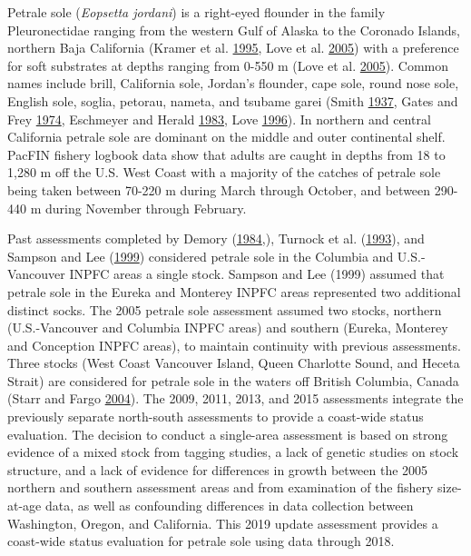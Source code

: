 \documentclass[12pt,]{article}
\begin{document}
Petrale sole (\emph{Eopsetta jordani}) is a right-eyed flounder in the
family Pleuronectidae ranging from the western Gulf of Alaska to the
Coronado Islands, northern Baja California (Kramer et al.
\protect\hyperlink{ref-kramer_guide_1995}{1995}, Love et al.
\protect\hyperlink{ref-love_milton_resource_2005}{2005}) with a
preference for soft substrates at depths ranging from 0-550 m (Love et
al. \protect\hyperlink{ref-love_milton_resource_2005}{2005}). Common
names include brill, California sole, Jordan's flounder, cape sole,
round nose sole, English sole, soglia, petorau, nameta, and tsubame
garei (Smith \protect\hyperlink{ref-smith_report_1937}{1937}, Gates and
Frey \protect\hyperlink{ref-gates_designated_1974}{1974}, Eschmeyer and
Herald \protect\hyperlink{ref-eschmeyer_field_1983}{1983}, Love
\protect\hyperlink{ref-love_milton_probably_1996}{1996}). In northern
and central California petrale sole are dominant on the middle and outer
continental shelf. PacFIN fishery logbook data show that adults are
caught in depths from 18 to 1,280 m off the U.S. West Coast with a
majority of the catches of petrale sole being taken between 70-220 m
during March through October, and between 290-440 m during November
through February.

Past assessments completed by Demory
(\protect\hyperlink{ref-demory_progress_1984}{1984},), Turnock et al.
(\protect\hyperlink{ref-turnock_status_1993}{1993}), and Sampson and Lee
(\protect\hyperlink{ref-sampson_assessment_1999}{1999}) considered
petrale sole in the Columbia and U.S.-Vancouver INPFC areas a single
stock. Sampson and Lee (1999) assumed that petrale sole in the Eureka
and Monterey INPFC areas represented two additional distinct socks. The
2005 petrale sole assessment assumed two stocks, northern
(U.S.-Vancouver and Columbia INPFC areas) and southern (Eureka, Monterey
and Conception INPFC areas), to maintain continuity with previous
assessments. Three stocks (West Coast Vancouver Island, Queen Charlotte
Sound, and Heceta Strait) are considered for petrale sole in the waters
off British Columbia, Canada (Starr and Fargo
\protect\hyperlink{ref-starr_petrale_2004}{2004}). The 2009, 2011, 2013,
and 2015 assessments integrate the previously separate north-south
assessments to provide a coast-wide status evaluation. The decision to
conduct a single-area assessment is based on strong evidence of a mixed
stock from tagging studies, a lack of genetic studies on stock
structure, and a lack of evidence for differences in growth between the
2005 northern and southern assessment areas and from examination of the
fishery size-at-age data, as well as confounding differences in data
collection between Washington, Oregon, and California. This 2019 update
assessment provides a coast-wide status evaluation for petrale sole
using data through 2018.
\end{document}
